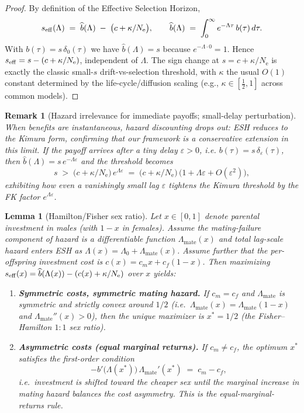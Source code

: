 \documentclass[11pt]{article}
\theoremstyle{upright}
\newtheorem{lemma}{Lemma}
\newtheorem{remark}{Remark}
\newcommand{\Ne}{N_{\mathrm{e}}}
\newcommand{\seff}[1][]{s_{\mathrm{eff}\if\relax\detokenize{#1}\relax\else,#1\fi}}
\begin{document}
\begin{proof}
By definition of the Effective Selection Horizon,
\[
\seff(\Lambda)\;=\;\widehat b(\Lambda)\;-\;\big(c+\kappa/\Ne\big),
\qquad
\widehat b(\Lambda)\;=\;\int_0^\infty e^{-\Lambda\tau}\,b(\tau)\,d\tau.
\]
With $b(\tau)=s\,\delta_0(\tau)$ we have $\widehat b(\Lambda)=s$ because $e^{-\Lambda\cdot 0}=1$. Hence $\seff=s-(c+\kappa/\Ne)$, independent of $\Lambda$. The sign change at $s=c+\kappa/\Ne$ is exactly the classic small-$s$ drift-vs-selection threshold, with $\kappa$ the usual $O(1)$ constant determined by the life-cycle/diffusion scaling (e.g., $\kappa\in[\tfrac12,1]$ across common models).
\end{proof}

\begin{remark}[Hazard irrelevance for immediate payoffs; small-delay perturbation]
When benefits are instantaneous, hazard discounting drops out: ESH reduces to the Kimura form, confirming that our framework is a conservative extension in this limit. If the payoff arrives after a tiny delay $\varepsilon>0$, i.e. $b(\tau)=s\,\delta_\varepsilon(\tau)$, then $\widehat b(\Lambda)=s\,e^{-\Lambda\varepsilon}$ and the threshold becomes
\[
s \;>\; \big(c+\kappa/\Ne\big)\,e^{\Lambda\varepsilon}
\;=\; \big(c+\kappa/\Ne\big)\,\big(1+\Lambda\varepsilon+O(\varepsilon^2)\big),
\]
exhibiting how even a vanishingly small lag $\varepsilon$ tightens the Kimura threshold by the FK factor $e^{\Lambda\varepsilon}$.
\end{remark}

\begin{lemma}[Hamilton/Fisher sex ratio]\label{lem:hamilton}
Let $x\in[0,1]$ denote parental investment in males (with $1-x$ in females).
Assume the mating-failure component of hazard is a differentiable function
$\Lambda_{\mathrm{mate}}(x)$ and total lag-scale hazard enters ESH as
$\Lambda(x)=\Lambda_0+\Lambda_{\mathrm{mate}}(x)$.
Assume further that the per-offspring investment cost is $c(x)=c_m x + c_f(1-x)$.
Then maximizing $\seff(x)=\widehat{b}(\Lambda(x))-(c(x)+\kappa/\Ne)$ over $x$ yields:
\begin{enumerate}[label=(\alph*)]
\item \textbf{Symmetric costs, symmetric mating hazard.} If $c_m=c_f$ and
$\Lambda_{\mathrm{mate}}$ is symmetric and strictly convex around $1/2$
(i.e.\ $\Lambda_{\mathrm{mate}}(x)=\Lambda_{\mathrm{mate}}(1-x)$ and $\Lambda_{\mathrm{mate}}''(x)>0$),
then the unique maximizer is $x^{\ast}=1/2$ (the Fisher--Hamilton $1{:}1$ sex ratio).
\item \textbf{Asymmetric costs (equal marginal returns).} If $c_m\neq c_f$,
the optimum $x^{\ast}$ satisfies the first-order condition
\begin{equation}\label{eq:hamilton-foc}
-\widehat{b}'\!\big(\Lambda(x^{\ast})\big)\,\Lambda_{\mathrm{mate}}'(x^{\ast}) \;=\; c_m-c_f,
\end{equation}
i.e.\ investment is shifted toward the cheaper sex until the marginal increase in mating hazard
balances the cost asymmetry. This is the equal-marginal-returns rule.
\end{enumerate}
\end{lemma}
\end{document}
